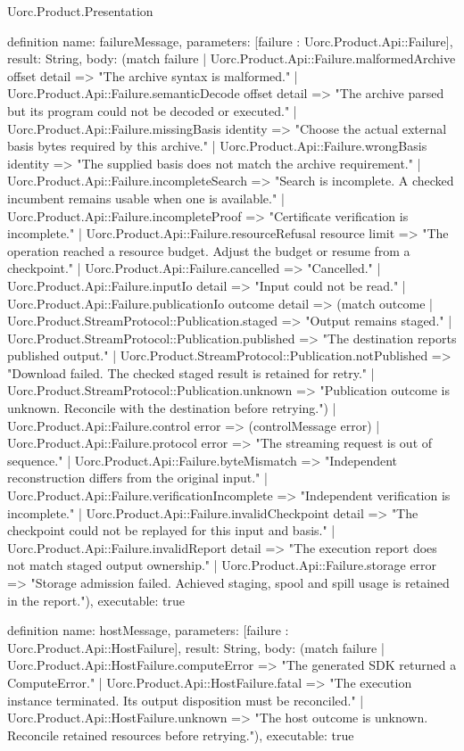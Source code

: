 \begin{lexlean}{Uorc.Product.Presentation}
\begin{semanticmodule}
definition{
  name: failureMessage,
  parameters: [failure : Uorc.Product.Api::Failure],
  result: String,
  body: (match failure
    | Uorc.Product.Api::Failure.malformedArchive offset detail => "The archive syntax is malformed."
    | Uorc.Product.Api::Failure.semanticDecode offset detail => "The archive parsed but its program could not be decoded or executed."
    | Uorc.Product.Api::Failure.missingBasis identity => "Choose the actual external basis bytes required by this archive."
    | Uorc.Product.Api::Failure.wrongBasis identity => "The supplied basis does not match the archive requirement."
    | Uorc.Product.Api::Failure.incompleteSearch => "Search is incomplete. A checked incumbent remains usable when one is available."
    | Uorc.Product.Api::Failure.incompleteProof => "Certificate verification is incomplete."
    | Uorc.Product.Api::Failure.resourceRefusal resource limit => "The operation reached a resource budget. Adjust the budget or resume from a checkpoint."
    | Uorc.Product.Api::Failure.cancelled => "Cancelled."
    | Uorc.Product.Api::Failure.inputIo detail => "Input could not be read."
    | Uorc.Product.Api::Failure.publicationIo outcome detail => (match outcome
      | Uorc.Product.StreamProtocol::Publication.staged => "Output remains staged."
      | Uorc.Product.StreamProtocol::Publication.published => "The destination reports published output."
      | Uorc.Product.StreamProtocol::Publication.notPublished => "Download failed. The checked staged result is retained for retry."
      | Uorc.Product.StreamProtocol::Publication.unknown => "Publication outcome is unknown. Reconcile with the destination before retrying.")
    | Uorc.Product.Api::Failure.control error => (controlMessage error)
    | Uorc.Product.Api::Failure.protocol error => "The streaming request is out of sequence."
    | Uorc.Product.Api::Failure.byteMismatch => "Independent reconstruction differs from the original input."
    | Uorc.Product.Api::Failure.verificationIncomplete => "Independent verification is incomplete."
    | Uorc.Product.Api::Failure.invalidCheckpoint detail => "The checkpoint could not be replayed for this input and basis."
    | Uorc.Product.Api::Failure.invalidReport detail => "The execution report does not match staged output ownership."
    | Uorc.Product.Api::Failure.storage error => "Storage admission failed. Achieved staging, spool and spill usage is retained in the report."),
  executable: true
}

definition{
  name: hostMessage,
  parameters: [failure : Uorc.Product.Api::HostFailure],
  result: String,
  body: (match failure
    | Uorc.Product.Api::HostFailure.computeError => "The generated SDK returned a ComputeError."
    | Uorc.Product.Api::HostFailure.fatal => "The execution instance terminated. Its output disposition must be reconciled."
    | Uorc.Product.Api::HostFailure.unknown => "The host outcome is unknown. Reconcile retained resources before retrying."),
  executable: true
}


\end{semanticmodule}
\end{lexlean}
